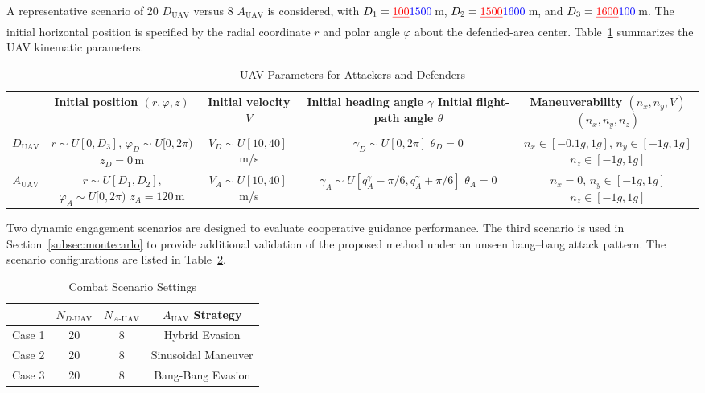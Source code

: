 \documentclass[lettersize,journal]{IEEEtran}
\newcommand{\hladd}[1]{{\color{blue}#1}}
\newcommand{\hldel}[1]{{\color{red}\sout{#1}}}
\begin{document}
A representative scenario of 20 $D_{\text{UAV}}$ versus 8 $A_{\text{UAV}}$ is considered, with $D_1=\hldel{100}\hladd{1500}$\,m,
$D_2=\hldel{1500}\hladd{1600}$\,m, and $D_3=\hldel{1600}\hladd{100}$\,m.
\hladd{The initial horizontal position is specified by the radial coordinate $r$ and polar angle $\varphi$ about the defended-area center.}
Table~\ref{chushicanshu} summarizes the UAV kinematic parameters.

\begin{table}[!t]
\centering
\caption{UAV Parameters for Attackers and Defenders}
\label{chushicanshu}
\renewcommand{\arraystretch}{1.6}
\footnotesize
\setlength{\tabcolsep}{3pt}
\begin{tabular}{ccccc}
\hline\hline
 & \hladd{Initial position $(r,\varphi,z)$} & Initial velocity $V$ & \shortstack{Initial heading angle $\gamma$\\ \hladd{Initial flight-path angle $\theta$}} & \shortstack{Maneuverability\\ \hldel{$(n_x,n_y,V)$}\hladd{$(n_x,n_y,n_z)$}} \\ \hline
$D_{\text{UAV}}$ & \shortstack{$r\sim U[0,D_3]$, \hladd{$\varphi_D\sim U[0,2\pi)$}\\ \hladd{$z_D=0$\,m}} & $V_D\sim U[10,40]$\,m/s & \shortstack{$\gamma_D\sim U[0,2\pi]$\\ \hladd{$\theta_D=0$}} & \shortstack{$n_x\in[-0.1g,1g]$, $n_y\in[-1g,1g]$\\ \hladd{$n_z\in[-1g,1g]$}} \\
$A_{\text{UAV}}$ & \shortstack{$r\sim U[D_1,D_2]$, \hladd{$\varphi_A\sim U[0,2\pi)$}\\ \hladd{$z_A=120$\,m}} & $V_A\sim U[10,40]$\,m/s & \shortstack{\hladd{$\gamma_A\sim U[q_A^{\gamma}-\pi/6,q_A^{\gamma}+\pi/6]$}\\ \hladd{$\theta_A=0$}} & \shortstack{$n_x=0$, $n_y\in[-1g,1g]$\\ \hladd{$n_z\in[-1g,1g]$}} \\ \hline
\end{tabular}
\end{table}

Two dynamic engagement scenarios are designed to evaluate cooperative guidance performance.
\hladd{The third scenario is used in Section~\ref{subsec:montecarlo} to provide additional validation of the proposed method under an unseen bang--bang attack pattern.}
The scenario configurations are listed in Table~\ref{changjingqingkuang}.


\begin{table}[!t]
\centering
\renewcommand{\arraystretch}{1.4}
\caption{Combat Scenario Settings}
\label{changjingqingkuang}
\begin{tabular}{cccc}
\hline\hline
 & $N_{D\text{-UAV}}$ & $N_{A\text{-UAV}}$ & $A_{\text{UAV}}$ Strategy \\ \hline
Case 1 & 20 & 8 & Hybrid Evasion \\
Case 2 & 20 & 8 & Sinusoidal Maneuver \\
\hladd{Case 3} & \hladd{20} & \hladd{8} & \hladd{Bang-Bang Evasion} \\ \hline
\end{tabular}
\end{table}
\end{document}
